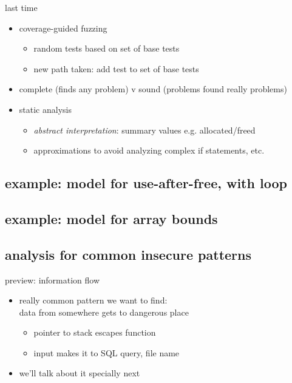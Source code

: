 \graphicspath{{./figures/}}
\title{}
\date{}

\begin{frame}
    \titlepage
\end{frame}

\begin{frame}{last time}
    \begin{itemize}
    \item coverage-guided fuzzing
        \begin{itemize}
        \item random tests based on set of base tests
        \item new path taken: add test to set of base tests
        \end{itemize}
    \item complete (finds any problem) v sound (problems found really problems)
    \item static analysis
        \begin{itemize}
        \item \textit{abstract interpretation}: summary values e.g. allocated/freed
        \item approximations to avoid analyzing complex if statements, etc.
        \end{itemize}
    \end{itemize}
\end{frame}

\subsection{example: model for use-after-free, with loop}


\subsection{example: model for array bounds}


\subsection{analysis for common insecure patterns}


\begin{frame}{preview: information flow}
    \begin{itemize}
    \item really common pattern we want to find: \\
        data from somewhere gets to dangerous place
        \begin{itemize}
        \item pointer to stack escapes function
        \item input makes it to SQL query, file name
        \end{itemize}
    \item we'll talk about it specially next
    \end{itemize}
\end{frame}

